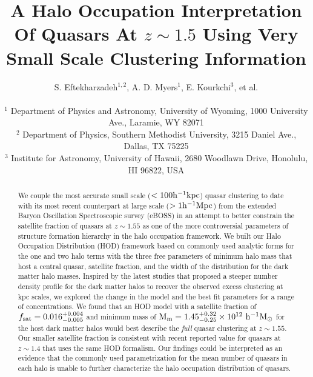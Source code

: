 \documentclass[useAMS,usenatbib]{mn2e}
\begin{document}

\title[Quasar HOD at $z \sim 1.5$]{A Halo Occupation Interpretation Of Quasars At $z\sim1.5$ Using Very Small Scale Clustering Information}
% 
\author[Eftekharzadeh et al.]{S. Eftekharzadeh$^{1,2}$,  A. D. Myers$^{1}$, E. Kourkchi$^{3}$, et al.\\
\\
$^{1}$ Department of Physics and Astronomy, University of Wyoming, 1000 University Ave., Laramie, WY 82071\\
$^{2}$ Department of Physics, Southern Methodist University, 3215 Daniel Ave., Dallas, TX 75225\\
$^{3}$ Institute for Astronomy, University of Hawaii, 2680 Woodlawn Drive, Honolulu, HI 96822, USA}
\maketitle


\begin{abstract}
We couple the most accurate small scale ($< 100 \rm h^{-1}kpc$) quasar clustering 
to date with its most recent counterpart at large scale ($> 1 \rm h^{-1}Mpc$) 
from the extended Baryon Oscillation Spectroscopic survey (eBOSS) in an attempt 
to better constrain the satellite fraction of quasars at $z\sim 1.55$ as one of the more controversial 
parameters of structure formation hierarchy in the halo occupation framework. 
We built our Halo Occupation Distribution (HOD) framework based on commonly 
used analytic forms for the one and two halo terms with the three free 
parameters of minimum halo mass that host a central quasar, satellite fraction, 
and the width of the distribution for the dark matter halo masses. Inspired by 
the latest studies that proposed a steeper number density profile for the dark 
matter halos to recover the observed excess clustering at kpc scales, we 
explored the change in the model and the best fit parameters for a range of 
concentrations. We found that an HOD model with a satellite fraction of $f_{\rm 
sat} = 0.016_{-0.005}^{+0.004}$ and minimum mass of $\rm M_{m} = 
1.45_{-0.25}^{+0.32} \times 10^{12}\, \, \rm h^{-1} M_{\odot}$ for the host dark matter 
halos would best describe the {\it full} quasar clustering at $z \sim 1.55$. Our 
smaller satellite fraction is consistent with recent reported value for 
quasars at $z\sim 1.4$ that uses the same HOD formalism. Our findings could be interpreted as an evidence that the commonly used parametrization for the mean number of quasars in each 
halo is unable to further characterize the halo occupation distribution of 
quasars.   



\end{abstract}
\end{document}
